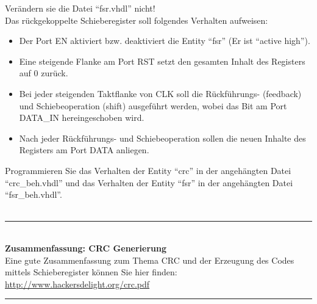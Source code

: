 \documentclass[a4paper,12pt]{article}
\begin{document}
\begin{center}
\end{center}

Ver\"andern sie die Datei "`fsr.vhdl"' nicht!
\\

Das r\"uckgekoppelte Schieberegister soll folgendes Verhalten aufweisen:
\begin{itemize}
    \item Der Port EN aktiviert bzw. deaktiviert die Entity "`fsr"' (Er ist "`active high"').
    \item Eine steigende Flanke am Port RST setzt den gesamten Inhalt des Registers auf 0 zur\"uck.
    \item Bei jeder steigenden Taktflanke von CLK soll die R\"uckf\"uhrungs- (feedback) und Schiebeoperation (shift) ausgef\"uhrt werden, wobei das Bit am Port DATA\_IN hereingeschoben wird.
    \item  Nach jeder R\"uckf\"uhrungs- und Schiebeoperation sollen die neuen Inhalte des Registers am Port DATA anliegen.
\end{itemize}


Programmieren Sie das Verhalten der Entity "`crc"' in der angeh\"angten Datei "`crc\_beh.vhdl"' und das Verhalten der Entity "`fsr"' in der angeh\"angten Datei "`fsr\_beh.vhdl"'.\\
\\
\rule{16cm}{0.4pt}
\\
\textbf{Zusammenfassung: CRC Generierung}
\\
Eine gute Zusammenfassung zum Thema CRC und der Erzeugung des Codes mittels Schieberegister k\"onnen Sie hier finden:\\
\url{http://www.hackersdelight.org/crc.pdf}
\\
\rule{16cm}{0.4pt}
\newpage
\end{document}
